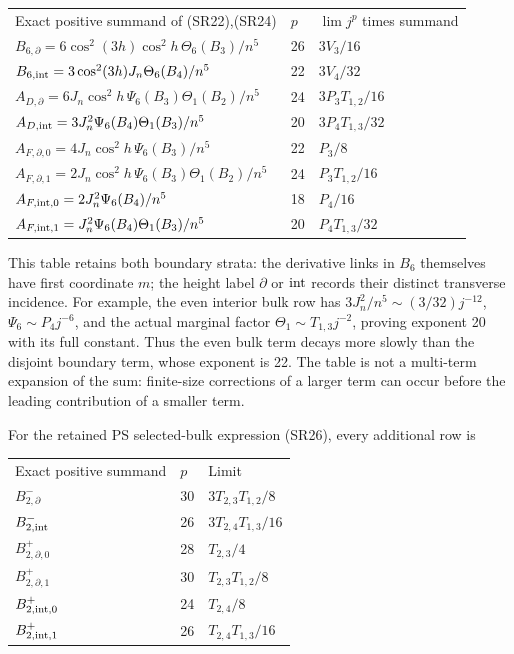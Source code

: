 \documentclass[11pt]{article}
\begin{document}
\begingroup\small\setlength{\tabcolsep}{3pt}\begin{longtable}{@{}p{}p{}p{}@{}}\toprule
Exact positive summand of (SR22),(SR24) & \(p\) & \(\lim j^p\) times summand\\
\(B_{6,\partial}=6\cos^2(3h)\cos^2h\,\Theta_6(B_3)/n^5\) & 26 & \(3V_3/16\)\\
\(B_{6,{\rm int}}=3\cos^2(3h)J_n\Theta_6(B_4)/n^5\) & 22 & \(3V_4/32\)\\
\(A_{D,\partial}=6J_n\cos^2h\,\Psi_6(B_3)\Theta_1(B_2)/n^5\) & 24 & \(3P_3T_{1,2}/16\)\\
\(A_{D,{\rm int}}=3J_n^2\Psi_6(B_4)\Theta_1(B_3)/n^5\) & 20 & \(3P_4T_{1,3}/32\)\\
\(A_{F,\partial,0}=4J_n\cos^2h\,\Psi_6(B_3)/n^5\) & 22 & \(P_3/8\)\\
\(A_{F,\partial,1}=2J_n\cos^2h\,\Psi_6(B_3)\Theta_1(B_2)/n^5\) & 24 & \(P_3T_{1,2}/16\)\\
\(A_{F,{\rm int},0}=2J_n^2\Psi_6(B_4)/n^5\) & 18 & \(P_4/16\)\\
\(A_{F,{\rm int},1}=J_n^2\Psi_6(B_4)\Theta_1(B_3)/n^5\) & 20 & \(P_4T_{1,3}/32\)\\
\bottomrule\end{longtable}\endgroup

This table retains both boundary strata: the derivative links in \(B_6\) themselves have first coordinate \(m\); the height label \(\partial\) or \({\rm int}\) records their distinct transverse incidence. For example, the even interior bulk row has \(3J_n^2/n^5\sim(3/32)j^{-12}\), \(\Psi_6\sim P_4j^{-6}\), and the actual marginal factor \(\Theta_1\sim T_{1,3}j^{-2}\), proving exponent 20 with its full constant. Thus the even bulk term decays more slowly than the disjoint boundary term, whose exponent is 22. The table is not a multi-term expansion of the sum: finite-size corrections of a larger term can occur before the leading contribution of a smaller term.

For the retained PS selected-bulk expression (SR26), every additional row is

\begingroup\small\setlength{\tabcolsep}{3pt}\begin{longtable}{@{}p{}p{}p{}@{}}\toprule
Exact positive summand & \(p\) & Limit\\
\(B_{2,\partial}^-\) & 30 & \(3T_{2,3}T_{1,2}/8\)\\
\(B_{2,{\rm int}}^-\) & 26 & \(3T_{2,4}T_{1,3}/16\)\\
\(B_{2,\partial,0}^+\) & 28 & \(T_{2,3}/4\)\\
\(B_{2,\partial,1}^+\) & 30 & \(T_{2,3}T_{1,2}/8\)\\
\(B_{2,{\rm int},0}^+\) & 24 & \(T_{2,4}/8\)\\
\(B_{2,{\rm int},1}^+\) & 26 & \(T_{2,4}T_{1,3}/16\)\\
\bottomrule\end{longtable}\endgroup
\end{document}
